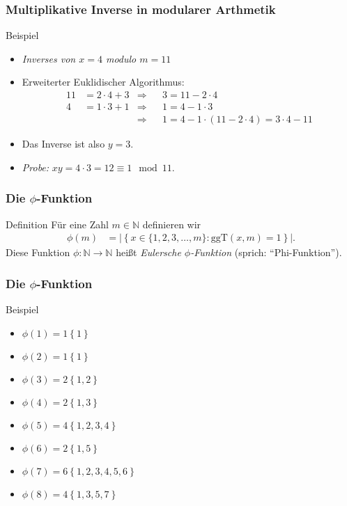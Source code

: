 \documentclass{beamer}
\renewcommand{\emph}[1]{{\textcolor{solarizedRed}{\itshape #1}}}
\newcommand\NN{\mathbb N}
\newcommand{\abs}[1]{\left|#1\right|}
\newcommand\bc[1]{\left({#1}\right)}
\newcommand\cbc[1]{\left\{{#1}\right\}}
\newcommand{\ggt}{\mathrm{ggT}}
\newcommand{\ue}{\"u}
\begin{document}
\begin{frame}\frametitle{Multiplikative Inverse in modularer Arthmetik}
\begin{block}{Beispiel}
\begin{itemize}
	\item \emph{Inverses von $x=4$ modulo $m=11$}
	\item Erweiterter Euklidischer Algorithmus:
		\begin{align*}
			11&=2\cdot 4+3&\Rightarrow&&3=11-2\cdot 4\\
			4&=1\cdot 3+1&\Rightarrow&&1=4-1\cdot 3\\
			 &&\Rightarrow&&1=4-1\cdot\bc{11-2\cdot 4}=3\cdot 4-11
		\end{align*}
	\item Das Inverse ist also $y=3$.
	\item \emph{Probe:} $xy=4\cdot 3=12\equiv 1\mod 11$.
\end{itemize}
\end{block}
\end{frame}

\begin{frame}\frametitle{Die $\phi$-Funktion}
	\begin{block}{Definition}
		F\ue r eine Zahl $m\in\NN$ definieren wir
		\begin{align*}
			\phi(m)&=\abs{\cbc{x\in\{1,2,3,\ldots,m\}:\ggt(x,m)=1}}.
		\end{align*}
		Diese Funktion $\phi:\NN\to\NN$ hei\ss t \emph{Eulersche $\phi$-Funktion} (sprich: ``Phi-Funktion'').
	\end{block}
\end{frame}

\begin{frame}\frametitle{Die $\phi$-Funktion}
	\begin{block}{Beispiel}
		\begin{itemize}
			\item $\phi(1)=1$\hfill  $\cbc{1}$
			\item $\phi(2)=1$\hfill  $\cbc{1}$
			\item $\phi(3)=2$\hfill  $\cbc{1,2}$
			\item $\phi(4)=2$\hfill  $\cbc{1,3}$
			\item $\phi(5)=4$\hfill  $\cbc{1,2,3,4}$
			\item $\phi(6)=2$\hfill  $\cbc{1,5}$
			\item $\phi(7)=6$\hfill  $\cbc{1,2,3,4,5,6}$
			\item $\phi(8)=4$\hfill  $\cbc{1,3,5,7}$
		\end{itemize}
	\end{block}
\end{frame}
\end{document}
